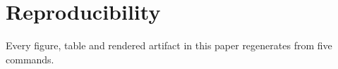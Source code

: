 \section{Reproducibility}
\label{sec:repro}

Every figure, table and rendered artifact in this paper regenerates from five
commands.

